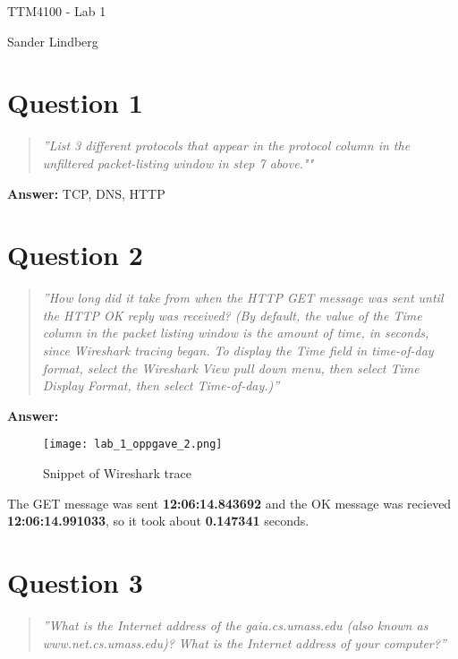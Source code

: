 \documentclass[12pt,a4paper]{article}
\begin{document}
\begin{titlepage}
    \centering
    \vspace*{\fill}

    \vspace*{0.5cm}

    \huge
    TTM4100 - Lab 1

    \vspace*{0.5cm}

    \large Sander Lindberg

    \vspace*{\fill}
    \end{titlepage}

	\newpage
	
	\section{Question 1}
		\begin{quote}
			\textit{
				''List 3 different protocols that appear in the protocol column in the unfiltered
				packet-listing window in step 7 above.""			
			}
		\end{quote}
		
		\textbf{Answer: } TCP, DNS, HTTP
		
	\section{Question 2}
		\begin{quote}
			\textit{
				''How long did it take from when the HTTP GET message was sent until the
				HTTP OK reply was received? (By default, the value of the Time column in the
				packet listing window is the amount of time, in seconds, since Wireshark
				tracing began. To display the Time field in time-of-day format, select the
				Wireshark View pull down menu, then select Time Display Format, then select
				Time-of-day.)''			
			}
		\end{quote}
	
		\textbf{Answer: } 
		\begin{figure}[hb!]
			\centering
			\texttt{[image: lab\_1\_oppgave\_2.png]}
			\caption{Snippet of Wireshark trace}
			\label{fig:oppgave2}
		\end{figure}
		
		The GET message was sent \textbf{12:06:14.843692} and the OK message was recieved \textbf{12:06:14.991033}, so it took about \textbf{0.147341} 			seconds.
		
		\section{Question 3}
			\begin{quote}
				\textit{
					''What is the Internet address of the gaia.cs.umass.edu (also known as
					www.net.cs.umass.edu)? What is the Internet address of your computer?''				
				}
			\end{quote}
			
\end{document}
